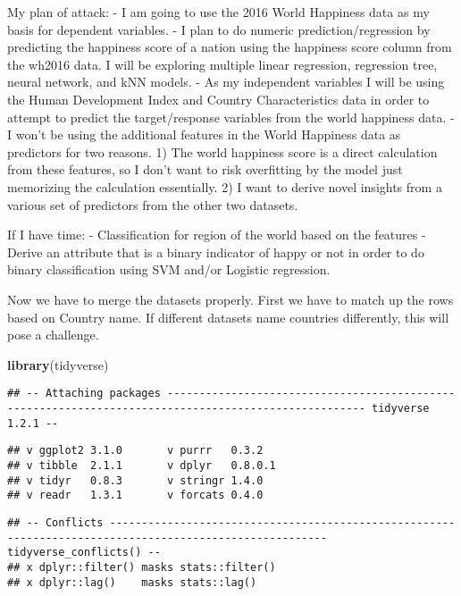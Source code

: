 \documentclass[]{article}
\newenvironment{Shaded}{\begin{snugshade}}{\end{snugshade}}
\newcommand{\KeywordTok}[1]{\textcolor[rgb]{0.13,0.29,0.53}{\textbf{#1}}}
\newcommand{\NormalTok}[1]{#1}
\begin{document}
My plan of attack: - I am going to use the 2016 World Happiness data as
my basis for dependent variables. - I plan to do numeric
prediction/regression by predicting the happiness score of a nation
using the happiness score column from the wh2016 data. I will be
exploring multiple linear regression, regression tree, neural network,
and kNN models. - As my independent variables I will be using the Human
Development Index and Country Characteristics data in order to attempt
to predict the target/response variables from the world happiness data.
- I won't be using the additional features in the World Happiness data
as predictors for two reasons. 1) The world happiness score is a direct
calculation from these features, so I don't want to risk overfitting by
the model just memorizing the calculation essentially. 2) I want to
derive novel insights from a various set of predictors from the other
two datasets.

If I have time: - Classification for region of the world based on the
features - Derive an attribute that is a binary indicator of happy or
not in order to do binary classification using SVM and/or Logistic
regression.

Now we have to merge the datasets properly. First we have to match up
the rows based on Country name. If different datasets name countries
differently, this will pose a challenge.

\begin{Shaded}
\begin{Highlighting}[]
\KeywordTok{library}\NormalTok{(tidyverse)}
\end{Highlighting}
\end{Shaded}

\begin{verbatim}
## -- Attaching packages ----------------------------------------------------------------------------------------------------- tidyverse 1.2.1 --
\end{verbatim}

\begin{verbatim}
## v ggplot2 3.1.0       v purrr   0.3.2  
## v tibble  2.1.1       v dplyr   0.8.0.1
## v tidyr   0.8.3       v stringr 1.4.0  
## v readr   1.3.1       v forcats 0.4.0
\end{verbatim}

\begin{verbatim}
## -- Conflicts -------------------------------------------------------------------------------------------------------- tidyverse_conflicts() --
## x dplyr::filter() masks stats::filter()
## x dplyr::lag()    masks stats::lag()
\end{verbatim}
\end{document}
